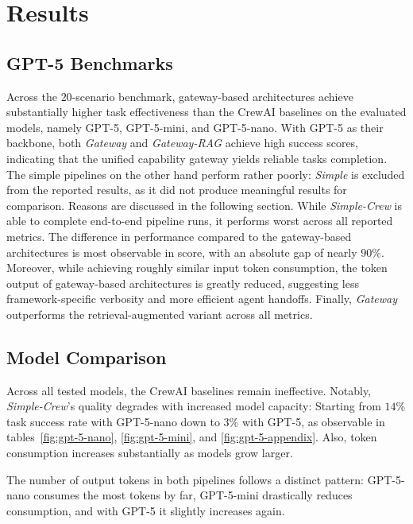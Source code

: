 \section{Results}\label{results}

\subsection{GPT-5 Benchmarks}

Across the $20$-scenario benchmark, gateway-based architectures achieve substantially higher task effectiveness than the CrewAI baselines on the evaluated models, namely GPT-5, GPT-5-mini, and GPT-5-nano.
With GPT-5 as their backbone, both \emph{Gateway} and \emph{Gateway-RAG} achieve high success scores, indicating that the unified capability gateway yields reliable tasks completion.
The simple pipelines on the other hand perform rather poorly:
\emph{Simple} is excluded from the reported results, as it did not produce meaningful results for comparison.
Reasons are discussed in the following section.
While \emph{Simple-Crew} is able to complete end-to-end pipeline runs, it performs worst across all reported metrics.
The difference in performance compared to the gateway-based architectures is most observable in score, with an absolute gap of nearly $90\%$.
Moreover, while achieving roughly similar input token consumption, the token output of gateway-based architectures is greatly reduced, suggesting less framework-specific verbosity and more efficient agent handoffs.
Finally, \emph{Gateway} outperforms the retrieval-augmented variant across all metrics.



\subsection{Model Comparison}

Across all tested models, the CrewAI baselines remain ineffective.
Notably, \emph{Simple-Crew}'s quality degrades with increased model capacity:
Starting from $14\%$ task success rate with GPT-5-nano down to $3\%$ with GPT-5, as observable in tables~\ref{fig:gpt-5-nano}, \ref{fig:gpt-5-mini}, and \ref{fig:gpt-5-appendix}.
Also, token consumption increases substantially as models grow larger.

The number of output tokens in both pipelines follows a distinct pattern:
GPT-5-nano consumes the most tokens by far, GPT-5-mini drastically reduces consumption, and with GPT-5 it slightly increases again.

